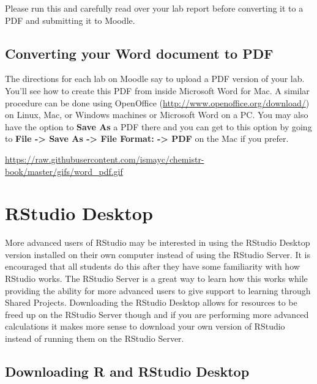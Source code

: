 \documentclass[]{tufte-book}
\begin{document}
Please run this and carefully read over your lab report before
converting it to a PDF and submitting it to Moodle.

\section{Converting your Word document to
PDF}\label{converting-your-word-document-to-pdf}

The directions for each lab on Moodle say to upload a PDF version of
your lab. You'll see how to create this PDF from inside Microsoft Word
for Mac. A similar procedure can be done using OpenOffice
(\url{http://www.openoffice.org/download/}) on Linux, Mac, or Windows
machines or Microsoft Word on a PC. You may also have the option to
\textbf{Save As} a PDF there and you can get to this option by going to
\textbf{File -\textgreater{} Save As -\textgreater{} File Format:
-\textgreater{} PDF} on the Mac if you prefer.

\vspace{0.1in}

\begin{center}\footnotesize{\url{https://raw.githubusercontent.com/ismayc/chemistr-book/master/gifs/word_pdf.gif}}\end{center}

\vspace{0.1in}

\appendix


\chapter{RStudio Desktop}\label{rstudio-desktop}

More advanced users of RStudio may be interested in using the RStudio
Desktop version installed on their own computer instead of using the
RStudio Server. It is encouraged that all students do this after they
have some familiarity with how RStudio works. The RStudio Server is a
great way to learn how this works while providing the ability for more
advanced users to give support to learning through Shared Projects.
Downloading the RStudio Desktop allows for resources to be freed up on
the RStudio Server though and if you are performing more advanced
calculations it makes more sense to download your own version of RStudio
instead of running them on the RStudio Server.

\section{Downloading R and RStudio
Desktop}\label{downloading-r-and-rstudio-desktop}
\end{document}
